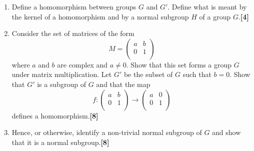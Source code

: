 \documentclass[a4paper]{article}
\begin{document}
\begin{qns}\leavevmode
\begin{enumerate}[label=(\alph*)]
\item Define a homomorphism between groups $G$ and $G'$. Define what is meant by the kernel of a homomorphism and by a normal subgroup $H$ of a group $G$.\hfill\textbf{[4]}
\item Consider the set of matrices of the form
$$M=\begin{pmatrix}a&b\\0&1\\\end{pmatrix}$$
where $a$ and $b$ are complex and $a\neq 0$. Show that this set forms a group $G$ under matrix multiplication. Let $G'$ be the subset of $G$ such that $b = 0$. Show that $G'$ is a subgroup of $G$ and that the map 
$$f:\begin{pmatrix}a&b\\0&1\\\end{pmatrix}\rightarrow\begin{pmatrix}a&0\\0&1\\\end{pmatrix}$$
defines a homomorphism.\hfill\textbf{[8]}
\item Hence, or otherwise, identify a non-trivial normal subgroup of $G$ and show that it is a normal subgroup.\hfill\textbf{[8]}
\end{enumerate}
\end{qns}
\newpage
\end{document}
